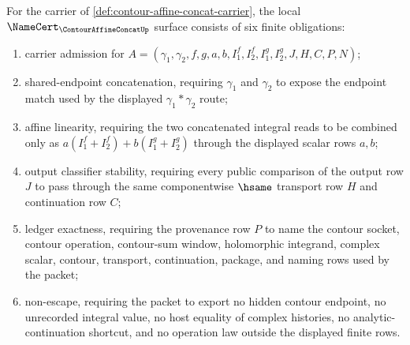 \begin{theorem}
\label{thm:contour-affine-concat-namecert-obligations}
For the carrier of \autoref{def:contour-affine-concat-carrier}, the local $\NameCert_{\ContourAffineConcatUp}$ surface consists of six finite obligations:
\begin{enumerate}
\item carrier admission for $A=(\gamma_1,\gamma_2,f,g,a,b,I_1^f,I_2^f,I_1^g,I_2^g,J,H,C,P,N)$;
\item shared-endpoint concatenation, requiring $\gamma_1$ and $\gamma_2$ to expose the endpoint match used by the displayed $\gamma_1\ast\gamma_2$ route;
\item affine linearity, requiring the two concatenated integral reads to be combined only as $a(I_1^f+I_2^f)+b(I_1^g+I_2^g)$ through the displayed scalar rows $a,b$;
\item output classifier stability, requiring every public comparison of the output row $J$ to pass through the same componentwise $\hsame$ transport row $H$ and continuation row $C$;
\item ledger exactness, requiring the provenance row $P$ to name the contour socket, contour operation, contour-sum window, holomorphic integrand, complex scalar, contour, transport, continuation, package, and naming rows used by the packet;
\item non-escape, requiring the packet to export no hidden contour endpoint, no unrecorded integral value, no host equality of complex histories, no analytic-continuation shortcut, and no operation law outside the displayed finite rows.
\end{enumerate}
\end{theorem}

